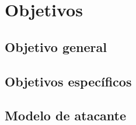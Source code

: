 
\chapter{Objetivos} %

\label{Chapter2} %


\section{Objetivo general}


\section{Objetivos específicos}


\section{Modelo de atacante}
